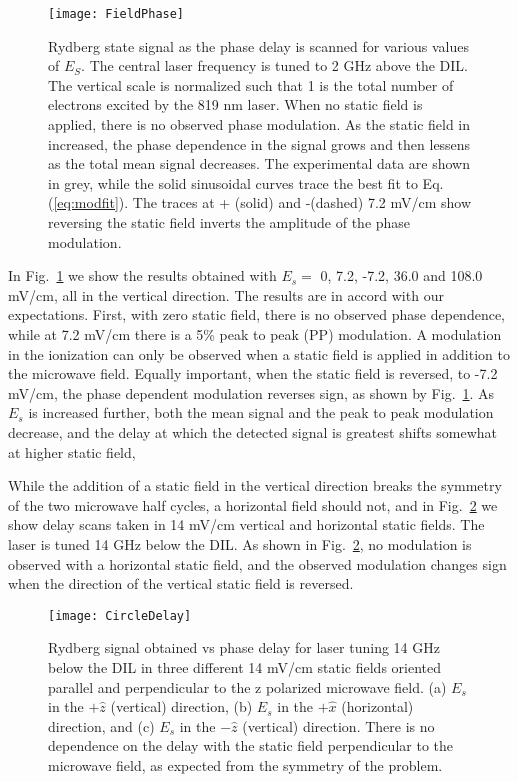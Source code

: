 \documentclass[aps,pra,reprint,groupedaddress]{revtex4-1}
\begin{document}
\begin{figure}
	\texttt{[image: FieldPhase]}
	\caption{Rydberg state signal as the phase delay is scanned for various values of $E_S$. The central laser frequency is tuned to 2 GHz above the DIL. The vertical scale is normalized such that 1 is the total number of electrons excited by the 819 nm laser. When no static field is applied, there is no observed phase modulation. As the static field in increased, the phase dependence in the signal grows and then lessens as the total mean signal decreases. The experimental data are shown in grey, while the solid sinusoidal curves trace the best fit to Eq. (\ref{eq:modfit}). The traces at + (solid) and -(dashed) 7.2 mV/cm show reversing the static field inverts the amplitude of the phase modulation.}
	\label{fig:fph}
\end{figure}

In Fig.~\ref{fig:fph} we show the results obtained with $E_{s}=$ 0, 7.2, -7.2, 36.0 and 108.0 mV/cm, all in the vertical direction. The results are in accord with our expectations. First, with zero static field, there is no observed phase dependence, while at 7.2 mV/cm there is a 5\% peak to peak (PP) modulation. A modulation in the ionization can only be observed when a static field is applied in addition to the microwave field. Equally important, when the static field is reversed, to -7.2 mV/cm, the phase dependent modulation reverses sign, as shown by Fig.~\ref{fig:fph}. As $E_s$ is increased further, both the mean signal and the peak to peak modulation decrease, and the delay at which the detected signal is greatest shifts somewhat at higher static field,

While the addition of a static field in the vertical direction breaks the symmetry of the two microwave half cycles, a horizontal field should not, and in Fig.~\ref{fig:CircleDelay} we show delay scans taken in 14 mV/cm vertical and horizontal static fields. The laser is tuned 14 GHz below the DIL. As shown in Fig.~\ref{fig:CircleDelay}, no modulation is observed with a horizontal static field, and the observed modulation changes sign when the direction of the vertical static field is reversed.

\begin{figure}
	\texttt{[image: CircleDelay]}
	\caption{Rydberg signal obtained vs phase delay for laser tuning 14 GHz below the DIL in three different 14 mV/cm static fields oriented parallel and perpendicular to the z polarized microwave field. (a) $E_s$ in the $+\hat{z}$ (vertical) direction, (b) $E_s$ in the $+\hat{x}$ (horizontal) direction, and (c) $E_s$ in the $-\hat{z}$ (vertical) direction. There is no dependence on the delay with the static field perpendicular to the microwave field, as expected from the symmetry of the problem.}
	\label{fig:CircleDelay}
\end{figure}
\end{document}
